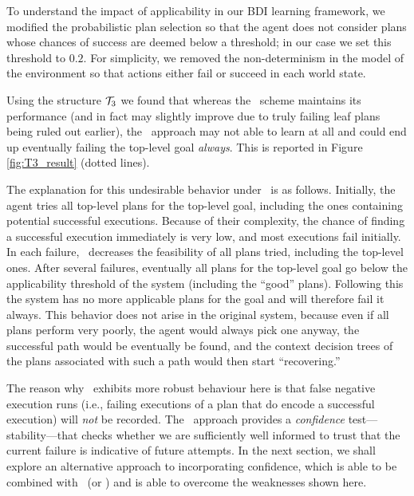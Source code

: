 To understand the impact of applicability in our BDI learning framework, we
modified the probabilistic plan selection so that the agent does not consider
plans whose chances of success are deemed below a threshold; in our case we set
this threshold to $0.2$.
For simplicity, we  removed the non-determinism in the model of the
environment so that actions either fail or succeed in each world state.

Using the structure ${\mathcal{T}}_3$ we found that whereas the \BUL\ scheme maintains its
performance (and in fact may slightly improve due to truly failing leaf plans
being ruled out earlier), the \CL\ approach may not able to learn at all and
could end up eventually failing the top-level goal \emph{always}. This is
reported in Figure \ref{fig:T3_result} (dotted lines).

The explanation for this undesirable behavior under \CL\ is as follows.
Initially, the agent tries all top-level plans for the top-level goal, including
the ones containing potential successful executions. Because of their complexity,
the chance of finding a successful execution immediately is very low,
and most executions fail initially. In each failure, \CL\ decreases the
feasibility of all plans tried, including the top-level ones.  After several
failures, eventually all plans for the top-level goal go below the applicability
threshold of the system (including the ``good'' plans). Following this the system
has no more applicable plans for the goal and will therefore fail it always.
This behavior does not arise in the original system, because even if
all plans perform very poorly, the agent would always pick one anyway,
the successful path would be eventually be found, and the context decision trees
of the plans associated with such a path would then start ``recovering.''


The reason why \BUL\ exhibits more robust behaviour here is that false negative
execution runs (i.e., failing executions of a plan that do encode a successful
execution) will \emph{not} be recorded.
The \BUL\ approach provides a \emph{confidence} test---stability---that
checks whether we are sufficiently well informed to trust that the
current failure is indicative of future attempts.
In the next section, we shall explore an alternative approach to
incorporating confidence, which is able to be combined with \CL\ (or
\BUL) and is able to overcome the weaknesses shown here.




